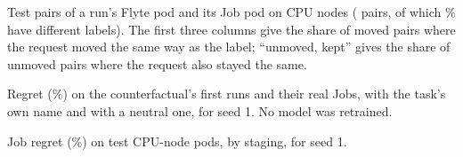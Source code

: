 \begin{table}[h]
\centering\small
\caption{Test pairs of a run's Flyte pod and its Job pod on CPU nodes (\pairsN{} pairs, of
which \pairsMoved\% have different labels). The first three columns give the share of
moved pairs where the request moved the same way as the label; ``unmoved, kept'' gives the
share of unmoved pairs where the request also stayed the same.}
\label{tab:pairs}

\end{table}

\begin{table}[h]
\centering\small
\caption{Regret (\%) on the counterfactual's first runs and their real Jobs, with the
task's own name and with a neutral one, for seed 1. No model was retrained.}
\label{tab:names}

\end{table}

\begin{table}[h]
\centering\small
\caption{Job regret (\%) on test CPU-node pods, by staging, for seed 1.}
\label{tab:staging}

\end{table}
